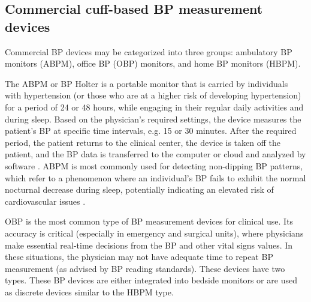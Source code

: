\documentclass[journal,article,moreauthors]{Definitions/mdpi}
\begin{document}
\subsection{Commercial cuff-based BP measurement devices}

Commercial BP devices may be categorized into three groups: ambulatory BP monitors (ABPM), office BP (OBP) monitors, and home BP monitors (HBPM).

The ABPM or BP Holter is a portable monitor that is carried by individuals with hypertension (or those who are at a higher risk of developing hypertension) for a period of 24 or 48 hours, while engaging in their regular daily activities and during sleep. Based on the physician's required settings, the device measures the patient's BP at specific time intervals, e.g. 15 or 30 minutes. After the required period, the patient returns to the clinical center, the device is taken off the patient, and the BP data is transferred to the computer or cloud and analyzed by software \citep{mousavi2018designing}. ABPM is most commonly used for detecting non-dipping BP patterns, which refer to a phenomenon where an individual's BP fails to exhibit the normal nocturnal decrease during sleep, potentially indicating an elevated risk of cardiovascular issues \citep{hassler2005circadian}.

OBP is the most common type of BP measurement devices for clinical use. Its accuracy is critical (especially in emergency and surgical units), where physicians make essential real-time decisions from the BP and other vital signs values. In these situations, the physician may not have adequate time to repeat BP measurement (as advised by BP reading standards). These devices have two types. These BP devices are either integrated into bedside monitors or are used as discrete devices similar to the HBPM type.
\end{document}
